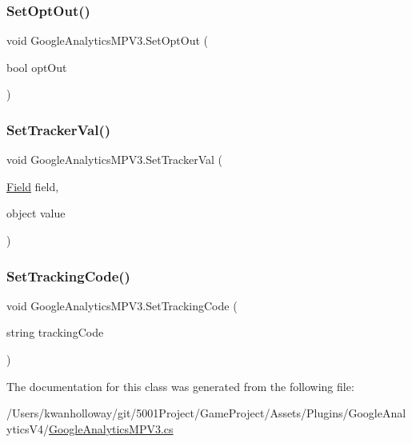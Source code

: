 \mbox{\label{class_google_analytics_m_p_v3_ad655b7e2d63ae214e09b789aa4cd847b}} 
\subsubsection{\texorpdfstring{Set\+Opt\+Out()}{SetOptOut()}}
{\footnotesize\ttfamily void Google\+Analytics\+M\+P\+V3.\+Set\+Opt\+Out (\begin{DoxyParamCaption}\item[{bool}]{opt\+Out }\end{DoxyParamCaption})}

\mbox{\label{class_google_analytics_m_p_v3_aa63e30b7b7f689242fbaaf1c55ada23a}} 
\subsubsection{\texorpdfstring{Set\+Tracker\+Val()}{SetTrackerVal()}}
{\footnotesize\ttfamily void Google\+Analytics\+M\+P\+V3.\+Set\+Tracker\+Val (\begin{DoxyParamCaption}\item[{\hyperlink{class_field}{Field}}]{field,  }\item[{object}]{value }\end{DoxyParamCaption})}

\mbox{\label{class_google_analytics_m_p_v3_a248c93d7193a440ae3219ce3a2ae5549}} 
\subsubsection{\texorpdfstring{Set\+Tracking\+Code()}{SetTrackingCode()}}
{\footnotesize\ttfamily void Google\+Analytics\+M\+P\+V3.\+Set\+Tracking\+Code (\begin{DoxyParamCaption}\item[{string}]{tracking\+Code }\end{DoxyParamCaption})}



The documentation for this class was generated from the following file\+:\begin{DoxyCompactItemize}
\item 
/\+Users/kwanholloway/git/5001\+Project/\+Game\+Project/\+Assets/\+Plugins/\+Google\+Analytics\+V4/\hyperlink{_google_analytics_m_p_v3_8cs}{Google\+Analytics\+M\+P\+V3.\+cs}\end{DoxyCompactItemize}
